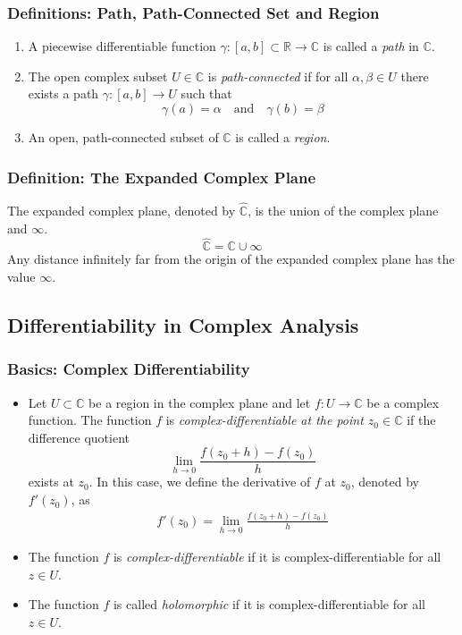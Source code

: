 \documentclass[11pt, a4paper]{article}
\newcommand{\R}{\mathbb{R}} %
\newcommand{\C}{\mathbb{C}} %
\begin{document}
\subsubsection{Definitions: Path, Path-Connected Set and Region}
\begin{enumerate}
	\item A piecewise differentiable function $ \gamma : [a, b] \subset \R \to \C $ is called a \textit{path} in $ \C $.
	\item The open complex subset $ U \in \C $ is \textit{path-connected} if for all $ \alpha, \beta \in U $ there exists a path $ \gamma:[a, b] \to U $ such that
	\begin{equation*}
		\gamma(a) = \alpha \quad \text{and} \quad \gamma(b) = \beta
	\end{equation*}
	
	\item An open, path-connected subset of $ \C $ is called a \textit{region}.
\end{enumerate}

\subsubsection{Definition: The Expanded Complex Plane}
The expanded complex plane, denoted by $ \hat{\C} $, is the union of the complex plane and $ \infty $.
\begin{equation*}
	\hat{\C} = \C \cup \infty
\end{equation*}
Any distance infinitely far from the origin of the expanded complex plane has the value $ \infty $.

\subsection{Differentiability in Complex Analysis}

\subsubsection{Basics: Complex Differentiability}
\begin{itemize}
	\item Let $ U \subset \C $ be a region in the complex plane and let $ f : U \to \C $ be a complex function. The function $ f $ is \textit{complex-differentiable at the point $ z_0 \in \C $} if the difference quotient
	\begin{equation*}
	\lim_{h \to 0} \frac{f(z_0 + h) - f(z_0)}{h}
	\end{equation*} 
	exists at $ z_0 $. In this case, we define the derivative of $ f $ at $ z_0 $, denoted by $ f'(z_0) $, as
	\begin{align*}
	f'(z_0) = \lim_{h \to 0} \frac{f(z_0 + h) - f(z_0)}{h}
	\end{align*}
	
	\item The function $ f $ is \textit{complex-differentiable} if it is complex-differentiable for all $ z \in U$.
	
	\item The function $ f $ is called \textit{holomorphic} if it is complex-differentiable for all $ z \in U $.
\end{itemize}
\end{document}
